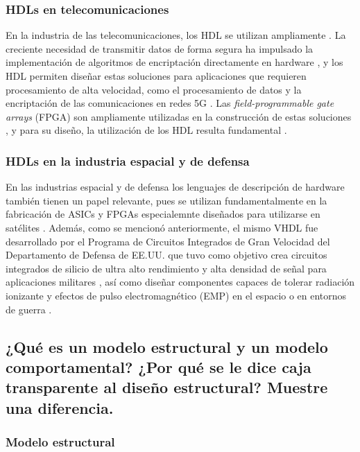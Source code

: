 \documentclass[12pt,letterpaper]{article}
\begin{document}
\subsubsection{HDLs en telecomunicaciones}

En la industria de las telecomunicaciones, los HDL se utilizan ampliamente \cite{saranyanandhini2025hdl}. La creciente necesidad de transmitir datos de forma segura ha impulsado la implementación de algoritmos de encriptación directamente en hardware \cite{saranyanandhini2025hdl}, y los HDL permiten diseñar estas soluciones para aplicaciones que requieren procesamiento de alta velocidad, como el procesamiento de datos y la encriptación de las comunicaciones en redes 5G \cite{visconti2021fpga}. Las \textit{field-programmable gate arrays} (FPGA) son ampliamente utilizadas en la construcción de estas soluciones \cite{kumar2013network} \cite{visconti2021fpga}, y para su diseño, la utilización de los HDL resulta fundamental \cite{smith1998hdl}.

\subsubsection{HDLs en la industria espacial y de defensa}

En las industrias espacial y de defensa los lenguajes de descripción de hardware también tienen un papel relevante, pues se utilizan fundamentalmente en la fabricación de ASICs y FPGAs especialemnte diseñados para utilizarse en satélites \cite{shim2024survey}. Además, como se mencionó anteriormente, el mismo VHDL fue desarrollado por el Programa de Circuitos Integrados de Gran Velocidad del Departamento de Defensa de EE.UU. \cite{harris2007} que tuvo como objetivo crea circuitos integrados de silicio de ultra alto rendimiento y alta densidad de señal para aplicaciones militares \cite{thornton1982very}, así como diseñar componentes capaces de tolerar radiación ionizante y efectos de pulso electromagnético (EMP) en el espacio o en entornos de guerra \cite{ieee_technav_vhsic}. 


\subsection{¿Qué es un modelo estructural y un modelo comportamental? ¿Por qué se le dice caja
transparente al diseño estructural? Muestre una diferencia.}

\subsubsection{Modelo estructural}
\end{document}
